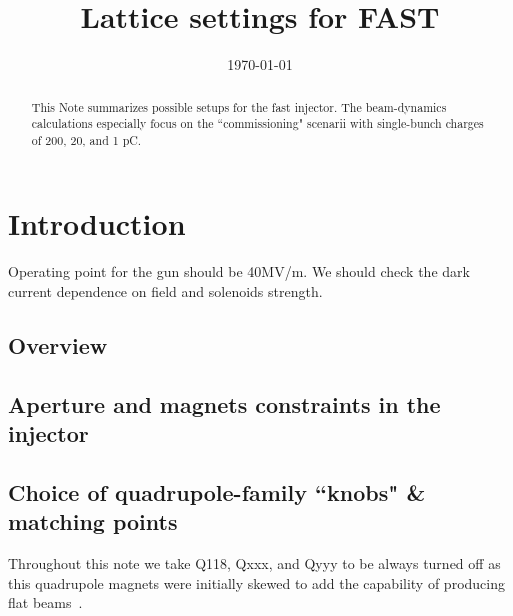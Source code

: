 \documentclass[notitlepage,twocolumn,nofootinbib,showpacs,preprintnumbers,superscriptaddress,amsmath,amssymb]{revtex4-1}
\begin{document}
\title{Lattice settings for FAST}
\date{\today}
	
\begin{abstract}
This Note summarizes possible setups for the {\sc fast} injector. The beam-dynamics calculations especially focus on the ``commissioning" scenarii with single-bunch charges of 200, 20, and 1 pC. 
\end{abstract}
\maketitle
%
\section{Introduction}

Operating point for the gun should be 40MV/m. We should check the dark current dependence on field and solenoids strength. 

\subsection{Overview}


\subsection{Aperture and magnets constraints in the injector}

\subsection{Choice of quadrupole-family ``knobs"  \& matching points}
Throughout this note we take Q118, Qxxx, and Qyyy to be always turned off as this quadrupole magnets were initially skewed to add the capability of producing  flat beams~\cite{jun}. 
\end{document}
